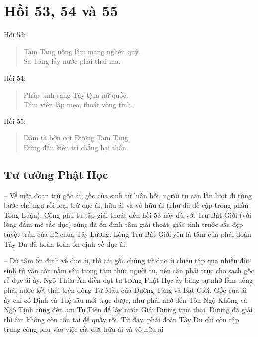 \chapter{Hồi 53, 54 và 55} %
\label{cha:hoi_53_54}

Hồi 53:

\begin{verse}
\begin{itshape}
Tam Tạng uống lầm mang nghén quỷ.\\
Sa Tăng lấy nước phải thai ma.
\end{itshape}
\end{verse}

Hồi 54:

\begin{verse}
\begin{itshape}
Pháp tính sang Tây Qua nữ quốc.\\
Tâm viên lập mẹo, thoát vòng tình.
\end{itshape}
\end{verse}

Hồi 55:

\begin{verse}
\begin{itshape}
Dâm tà bỡn cợt Đường Tam Tạng.\\
Đứng đắn kiên trì chẳng hại thân.
\end{itshape}
\end{verse}

\section{Tư tưởng Phật Học} %
\label{sec:53_54_phat_hoc}

-- Về mặt đoạn trừ gốc ái, gốc của sinh tử luân hồi, người tu cần lần lượt đi từng bước chế ngự rồi loại trừ dục ái, hữu ái và vô hữu ái (như đã đề cập trong phần Tổng Luận). Công phu tu tập giải thoát đến hồi 53 này dù với Trư Bát Giới (với lòng đắm mê sắc dục) cũng đã ổn định tâm giải thoát, giác tỉnh trước sắc đẹp tuyệt trần của nữ chúa Tây Lương. Lòng Trư Bát Giới yên là tâm của phái đoàn Tây Du đã hoàn toàn ổn định về dục ái.

-- Dù tâm ổn định về dục ái, thì cái gốc chủng tử dục ái chiêu tập qua nhiều đời sinh tử vẫn còn nằm sâu trong tâm thức người tu, nên cần phải trục cho sạch gốc rễ dục ái ấy. Ngô Thừa Ân diễn đạt tư tưởng Phật Học ấy bằng sự nhỡ lầm uống phải nước kết thai trên dòng Tử Mẫu của Đường Tăng và Bát Giới. Gốc của ái ấy chỉ có Định và Tuệ sâu mới trục được, như phải nhờ đến Tôn Ngộ Không và Ngộ Tịnh cùng đến am Tụ Tiên để lấy nước Giải Dương trục thai. Dương đã giải thì âm không còn tồn tại để quấy rối. Từ đây, phái đoàn Tây Du chỉ còn tập trung công phu vào việc cắt đứt hữu ái và vô hữu ái

